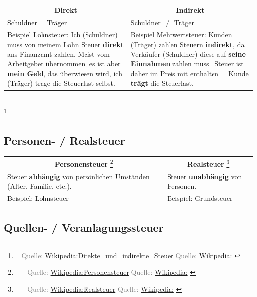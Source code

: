 \documentclass[draft]{beamer}
\let\oldfootnote\footnote
\renewcommand{\footnote}[1]
{%
	\oldfootnote
	{
		\tiny
		\textcolor{gray}{\ #1}
	}%
}
\newcommand{\citewiki}[2][]
{%
	\footnote
	{
		\ifthenelse{\isempty{#1}}
		{
			Quelle: \href{https://de.wikipedia.org/wiki/#2}{Wikipedia:#2}
		}
		{
			Quelle: \href{https://de.wikipedia.org/wiki/#2}{Wikipedia:#1}
		}
	}
}
\begin{document}
			\begin{frame}
				\begin{tabularx}{\linewidth}{X|X}
					\multicolumn{1}{c|}{\textbf{Direkt}} &
					\multicolumn{1}{c}{\textbf{Indirekt}} \\[0.25cm]
					Schuldner = Träger & Schuldner $\neq$ Träger \\
					\vspace{0.25cm}Beispiel Lohnsteuer: \newline
						Ich (Schuldner) muss von meinem Lohn Steuer \textbf{direkt} ans Finanzamt zahlen. Meist vom Arbeitgeber übernommen, es ist aber \textbf{mein Geld}, das überwiesen wird, ich (Träger) trage die Steuerlast selbst. & 
					\vspace{0.25cm}Beispiel Mehrwertsteuer: \newline
						Kunden (Träger) zahlen Steuern \textbf{indirekt}, da Verkäufer (Schuldner) diese auf \textbf{seine Einnahmen} zahlen muss \textrightarrow\ Steuer ist daher im Preis mit enthalten = Kunde \textbf{trägt} die Steuerlast.
				\end{tabularx}\\
				\citewiki{Direkte\_und\_indirekte\_Steuer}
			\end{frame}
		
		\subsection{Personen- / Realsteuer}
		
			\begin{frame}
				\begin{tabularx}{\linewidth}{X|X}
					\multicolumn{1}{c|}{\textbf{Personensteuer}\citewiki{Personensteuer}} &
					\multicolumn{1}{c}{\textbf{Realsteuer}\citewiki{Realsteuer}} \\[0.25cm]
					Steuer \textbf{abhängig} von persönlichen Umständen (Alter, Familie, etc.). & Steuer \textbf{unabhängig} von Personen. \\
					\vspace{0.25cm} Beispiel: Lohnsteuer &
					\vspace{0.25cm} Beispiel: Grundsteuer
				\end{tabularx}
			\end{frame}
		
		\subsection{Quellen- / Veranlagungssteuer}
		
\end{document}
